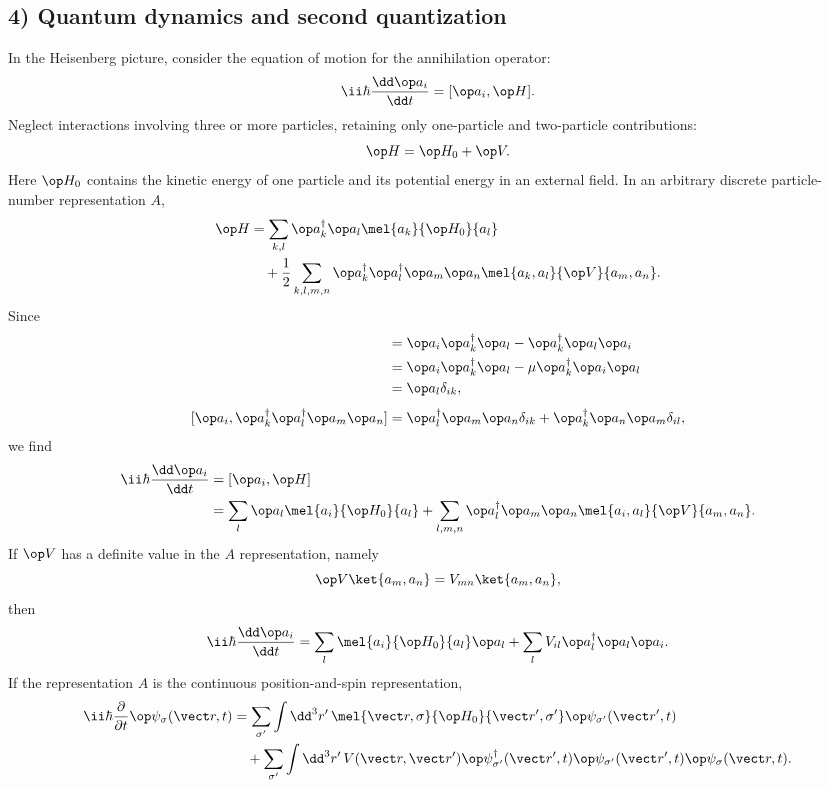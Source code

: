 \subsection*{4) Quantum dynamics and second quantization}
In the Heisenberg picture, consider the equation of motion for the annihilation operator:
\[\ii\hbar\frac{\dd\op a_i}{\dd t}=[\op a_i,\op H].\]
Neglect interactions involving three or more particles, retaining only one-particle and two-particle contributions:
\[\op H=\op H_0+\op V.\]
Here $\op H_0$ contains the kinetic energy of one particle and its potential energy in an external field. In an arbitrary discrete particle-number representation $A$,
\begin{align*}
\op H
&=\sum_{k,l}\op a_k^\dagger\op a_l\mel{a_k}{\op H_0}{a_l}\\
&\quad+\frac12\sum_{k,l,m,n}
\op a_k^\dagger\op a_l^\dagger\op a_m\op a_n
\mel{a_k,a_l}{\op V}{a_m,a_n}.
\end{align*}
Since
\begin{align*}
[\op a_i,\op a_k^\dagger\op a_l]
&=\op a_i\op a_k^\dagger\op a_l-\op a_k^\dagger\op a_l\op a_i\\
&=\op a_i\op a_k^\dagger\op a_l-\mu\op a_k^\dagger\op a_i\op a_l\\
&=\op a_l\delta_{ik},\\[4pt]
[\op a_i,\op a_k^\dagger\op a_l^\dagger\op a_m\op a_n]
&=\op a_l^\dagger\op a_m\op a_n\delta_{ik}
+\op a_k^\dagger\op a_n\op a_m\delta_{il},
\end{align*}
we find
\begin{align*}
\ii\hbar\frac{\dd\op a_i}{\dd t}
&=[\op a_i,\op H]\\
&=\sum_l\op a_l\mel{a_i}{\op H_0}{a_l}
+\sum_{l,m,n}\op a_l^\dagger\op a_m\op a_n
\mel{a_i,a_l}{\op V}{a_m,a_n}.
\end{align*}
If $\op V$ has a definite value in the $A$ representation, namely
\[\op V\ket{a_m,a_n}=V_{mn}\ket{a_m,a_n},\]
then
\[\ii\hbar\frac{\dd\op a_i}{\dd t}
=\sum_l\mel{a_i}{\op H_0}{a_l}\op a_l
+\sum_lV_{il}\op a_l^\dagger\op a_l\op a_i.\]
If the representation $A$ is the continuous position-and-spin representation,
\begin{align*}
\ii\hbar\frac{\partial}{\partial t}\op\psi_\sigma(\vect r,t)
&=\sum_{\sigma'}\int\dd^3r'\,
\mel{\vect r,\sigma}{\op H_0}{\vect r',\sigma'}
\op\psi_{\sigma'}(\vect r',t)\\
&\quad+\sum_{\sigma'}\int\dd^3r'\,
V(\vect r,\vect r')
\op\psi_{\sigma'}^\dagger(\vect r',t)
\op\psi_{\sigma'}(\vect r',t)
\op\psi_\sigma(\vect r,t).
\end{align*}
